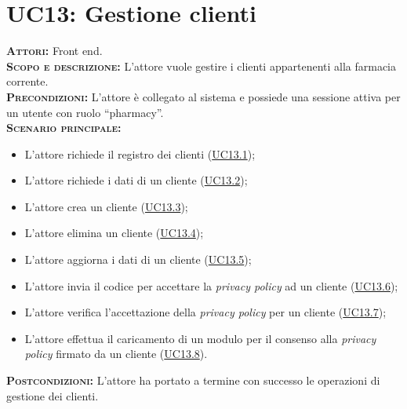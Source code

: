 \section{UC13: Gestione clienti}
\label{sec:UC13}
\textsc{\textbf{Attori:}} Front end.\\
\textsc{\textbf{Scopo e descrizione:}} L'attore vuole gestire i clienti appartenenti alla farmacia corrente.\\
\textsc{\textsc{\textbf{Precondizioni:}}} L'attore è collegato al sistema e possiede una sessione attiva per un utente con ruolo ``pharmacy''.\\
\textsc{\textbf{Scenario principale:}}
\begin{itemize}
    \item L'attore richiede il registro dei clienti (\hyperref[sec:UC131]{UC13.1});
    \item L'attore richiede i dati di un cliente (\hyperref[sec:UC132]{UC13.2});
    \item L'attore crea un cliente (\hyperref[sec:UC133]{UC13.3});
    \item L'attore elimina un cliente (\hyperref[sec:UC134]{UC13.4});
    \item L'attore aggiorna i dati di un cliente (\hyperref[sec:UC135]{UC13.5});
    \item L'attore invia il codice per accettare la \textit{privacy policy} ad un cliente (\hyperref[sec:UC136]{UC13.6});
    \item L'attore verifica l'accettazione della \textit{privacy policy} per un cliente (\hyperref[sec:UC137]{UC13.7});
    \item L'attore effettua il caricamento di un modulo per il consenso alla \textit{privacy policy} firmato da un cliente (\hyperref[sec:UC138]{UC13.8}).
\end{itemize}
\textsc{\textbf{Postcondizioni:}} L'attore ha portato a termine con successo le operazioni di gestione dei clienti.

